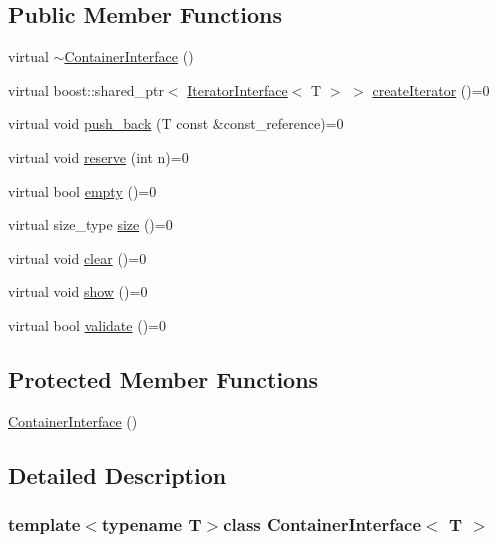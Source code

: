 \subsection*{Public Member Functions}
\begin{DoxyCompactItemize}
\item 
virtual \hyperlink{class_container_interface_a5e7db3193461a44c1e05c1ecc9caed95}{$\sim$ContainerInterface} ()
\item 
virtual boost::shared\_\-ptr$<$ \hyperlink{class_iterator_interface}{IteratorInterface}$<$ T $>$ $>$ \hyperlink{class_container_interface_a70769b558499b31462fa291db3d13b30}{createIterator} ()=0
\item 
virtual void \hyperlink{class_container_interface_a261e2fb8c71777d127052d2aef60b182}{push\_\-back} (T const \&const\_\-reference)=0
\item 
virtual void \hyperlink{class_container_interface_aa2023fa458c061c5293be5364bc1d440}{reserve} (int n)=0
\item 
virtual bool \hyperlink{class_container_interface_a47b337e49cd7b9f75d6964238fa7e8bc}{empty} ()=0
\item 
virtual size\_\-type \hyperlink{class_container_interface_aa194c58e394eeb6ae6655f14ab74823a}{size} ()=0
\item 
virtual void \hyperlink{class_container_interface_a321e214f22940891f51f4fd45ed8d106}{clear} ()=0
\item 
virtual void \hyperlink{class_container_interface_a09d9a76fd7e867951bdced07134259a3}{show} ()=0
\item 
virtual bool \hyperlink{class_container_interface_a550edb62b31da71cd66270d87bc81c97}{validate} ()=0
\end{DoxyCompactItemize}
\subsection*{Protected Member Functions}
\begin{DoxyCompactItemize}
\item 
\hyperlink{class_container_interface_a1203fe4cd19f556845500ad07a0a16d5}{ContainerInterface} ()
\end{DoxyCompactItemize}


\subsection{Detailed Description}
\subsubsection*{template$<$typename T$>$class ContainerInterface$<$ T $>$}

